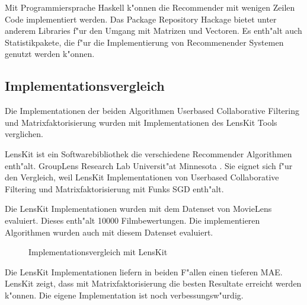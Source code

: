 \documentclass[a4paper, 12pt]{article}
\begin{document}
Mit Programmiersprache Haskell k"onnen die Recommender mit wenigen Zeilen Code implementiert werden. Das Package Repository Hackage bietet unter anderem Libraries f"ur den Umgang mit Matrizen und Vectoren. Es enth"alt auch Statistikpakete, die f"ur die Implementierung von Recommenender Systemen genutzt werden k"onnen.

\subsection{Implementationsvergleich}
\label{sec:compare}

Die Implementationen der beiden Algorithmen Userbased Collaborative Filtering und Matrixfaktorisierung wurden mit Implementationen des LensKit Tools verglichen. 

LensKit ist ein Softwarebibliothek die verschiedene Recommender Algorithmen enth"alt. GroupLens Research Lab Universit"at Minnesota \cite{ekstrandlk11}. Sie eignet sich f"ur den Vergleich, weil LensKit Implementationen von Userbased Collaborative Filtering und Matrixfaktorisierung mit Funks SGD enth"alt.

Die LensKit Implementationen wurden mit dem Datenset von MovieLens evaluiert. Dieses enth"alt 10000 Filmbewertungen. Die implementieren Algorithmen wurden auch mit diesem Datenset evaluiert.
\begin{figure}
  \centering
{} 
  
  \caption{Implementationsvergleich mit LensKit}
  \label{fig:compareimpl}
\end{figure}

Die LensKit Implementationen liefern in beiden F"allen einen tieferen MAE. LensKit zeigt, dass mit Matrixfaktorisierung die besten Resultate erreicht werden k"onnen. Die eigene Implementation ist noch verbessungsw"urdig.



\end{document}
